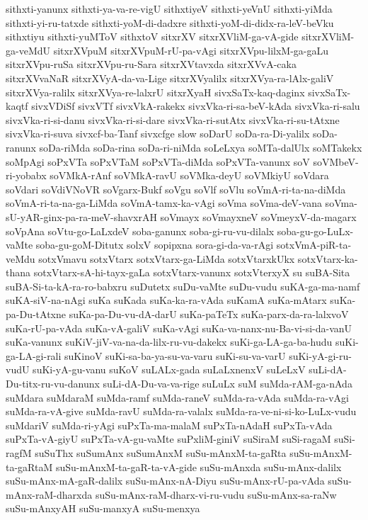 {sithxti-yanunx
sithxti-ya-va-re-vigU
sithxtiyeV
sithxti-yeVnU
sithxti-yiMda
sithxti-yi-ru-tatxde
sithxti-yoM-di-dadxre
sithxti-yoM-di-didx-ra-leV-beVku
sithxtiyu
sithxti-yuMToV
sithxtoV
sitxrXV
sitxrXVliM-ga-vA-gide
sitxrXVliM-ga-veMdU
sitxrXVpuM
sitxrXVpuM-rU-pa-vAgi
sitxrXVpu-lilxM-ga-gaLu
sitxrXVpu-ruSa
sitxrXVpu-ru-Sara
sitxrXVtavxda
sitxrXVvA-caka
sitxrXVvaNaR
sitxrXVyA-da-va-Lige
sitxrXVyalilx
sitxrXVya-ra-lAlx-galiV
sitxrXVya-ralilx
sitxrXVya-re-lalxrU
sitxrXyaH
sivxSaTx-kaq-daginx
sivxSaTx-kaqtf
sivxVDiSf
sivxVTf
sivxVkA-rakekx
sivxVka-ri-sa-beV-kAda
sivxVka-ri-salu
sivxVka-ri-si-danu
sivxVka-ri-si-dare
sivxVka-ri-sutAtx
sivxVka-ri-su-tAtxne
sivxVka-ri-suva
sivxcf-ba-Tanf
sivxcfge
slow
soDarU
soDa-ra-Di-yalilx
soDa-ranunx
soDa-riMda
soDa-rina
soDa-ri-niMda
soLeLxya
soMTa-dalUlx
soMTakekx
soMpAgi
soPxVTa
soPxVTaM
soPxVTa-diMda
soPxVTa-vanunx
soV
soVMbeV-ri-yobabx
soVMkA-rAnf
soVMkA-ravU
soVMka-deyU
soVMkiyU
soVdara
soVdari
soVdiVNoVR
soVgarx-Bukf
soVgu
soVlf
soVlu
soVmA-ri-ta-na-diMda
soVmA-ri-ta-na-ga-LiMda
soVmA-tamx-ka-vAgi
soVma
soVma-deV-vana
soVma-sU-yAR-ginx-pa-ra-meV-shavxrAH
soVmayx
soVmayxneV
soVmeyxV-da-magarx
soVpAna
soVtu-go-LaLxdeV
soba-ganunx
soba-gi-ru-vu-dilalx
soba-gu-go-LuLx-vaMte
soba-gu-goM-Ditutx
solxV
sopipxna
sora-gi-da-va-rAgi
sotxVmA-piR-ta-veMdu
sotxVmavu
sotxVtarx
sotxVtarx-ga-LiMda
sotxVtarxkUkx
sotxVtarx-ka-thana
sotxVtarx-sA-hi-tayx-gaLa
sotxVtarx-vanunx
sotxVterxyX
su
suBA-Sita
suBA-Si-ta-kA-ra-ro-babxru
suDutetx
suDu-vaMte
suDu-vudu
suKA-ga-ma-namf
suKA-siV-na-nAgi
suKa
suKada
suKa-ka-ra-vAda
suKamA
suKa-mAtarx
suKa-pa-Du-tAtxne
suKa-pa-Du-vu-dA-darU
suKa-paTeTx
suKa-parx-da-ra-lalxvoV
suKa-rU-pa-vAda
suKa-vA-galiV
suKa-vAgi
suKa-va-nanx-nu-Ba-vi-si-da-vanU
suKa-vanunx
suKiV-jiV-va-na-da-lilx-ru-vu-dakekx
suKi-ga-LA-ga-ba-hudu
suKi-ga-LA-gi-rali
suKinoV
suKi-sa-ba-ya-su-va-varu
suKi-su-va-varU
suKi-yA-gi-ru-vudU
suKi-yA-gu-vanu
suKoV
suLALx-gada
suLaLxnenxV
suLeLxV
suLi-dA-Du-titx-ru-vu-danunx
suLi-dA-Du-va-va-rige
suLuLx
suM
suMda-rAM-ga-nAda
suMdara
suMdaraM
suMda-ramf
suMda-raneV
suMda-ra-vAda
suMda-ra-vAgi
suMda-ra-vA-give
suMda-ravU
suMda-ra-valalx
suMda-ra-ve-ni-si-ko-LuLx-vudu
suMdariV
suMda-ri-yAgi
suPxTa-ma-malaM
suPxTa-nAdaH
suPxTa-vAda
suPxTa-vA-giyU
suPxTa-vA-gu-vaMte
suPxliM-giniV
suSiraM
suSi-ragaM
suSi-ragfM
suSuThx
suSumAnx
suSumAnxM
suSu-mAnxM-ta-gaRta
suSu-mAnxM-ta-gaRtaM
suSu-mAnxM-ta-gaR-ta-vA-gide
suSu-mAnxda
suSu-mAnx-dalilx
suSu-mAnx-mA-gaR-dalilx
suSu-mAnx-nA-Diyu
suSu-mAnx-rU-pa-vAda
suSu-mAnx-raM-dharxda
suSu-mAnx-raM-dharx-vi-ru-vudu
suSu-mAnx-sa-raNw
suSu-mAnxyAH
suSu-manxyA
suSu-menxya
}

